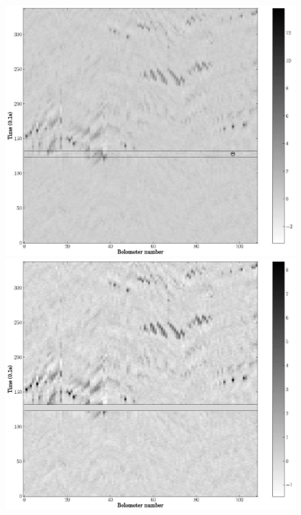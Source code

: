 \documentclass[12pt,preprint]{aastex}
\begin{document}
\setcounter{subfig}{1}
\begin{figure}
  \begin{minipage}{3.25in}
    \begin{center}
      \includegraphics[scale=0.25]{f9a}%
    \end{center}
  \end{minipage}
  \begin{minipage}{3.25in}
    \begin{center}
      \includegraphics[scale=0.25]{f9b}%
    \end{center}
  \end{minipage}


\end{figure}
\end{document}
